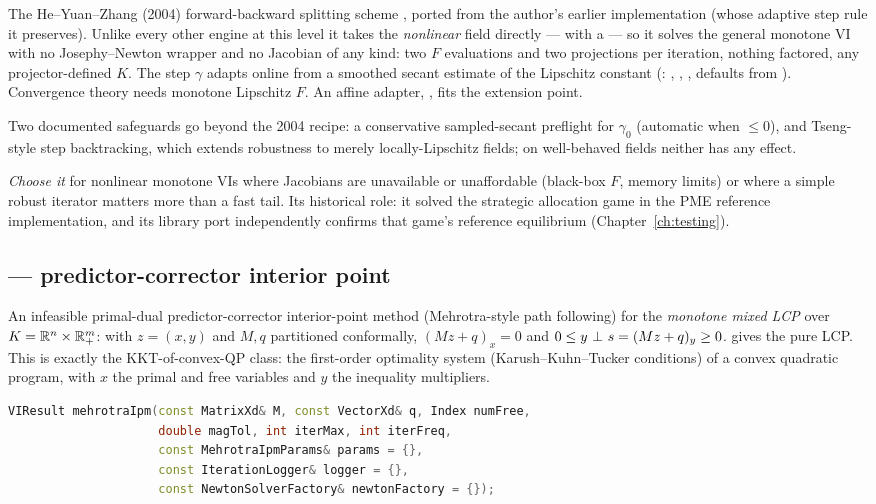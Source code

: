 The He--Yuan--Zhang (2004) forward-backward splitting scheme
\cite{hyz2004}, ported from the author's earlier 
implementation (whose adaptive step rule it preserves). Unlike every other
engine at this level it takes the \emph{nonlinear} field directly ---
 with
 a  --- so it solves the general monotone VI with
no Josephy--Newton wrapper and no Jacobian of any kind: two $F$ evaluations
and two projections per iteration, nothing factored, any projector-defined
$K$. The step $\gamma$ adapts online from a smoothed secant estimate of the
Lipschitz constant (: , ,
, defaults from ). Convergence theory needs
monotone Lipschitz $F$. An affine adapter, , fits
the  extension point.

Two documented safeguards go beyond the 2004 recipe: a conservative
sampled-secant preflight for $\gamma_0$ (automatic when 
$\le 0$), and Tseng-style step backtracking, which extends robustness to
merely locally-Lipschitz fields; on well-behaved fields neither has any
effect.

\emph{Choose it} for nonlinear monotone VIs where Jacobians are unavailable
or unaffordable (black-box $F$, memory limits) or where a simple robust
iterator matters more than a fast tail. Its historical role: it solved the
strategic allocation game in the PME reference implementation, and its
library port independently confirms that game's reference equilibrium
(Chapter~\ref{ch:testing}).

\subsection{ --- predictor-corrector interior point}
\label{sec:ipm}

An infeasible primal-dual predictor-corrector interior-point method
(Mehrotra-style path following) for the \emph{monotone mixed LCP} over
$K = \mathbb{R}^{n} \times \mathbb{R}^{m}_{+}$: with $z = (x, y)$ and $M, q$ partitioned conformally,
$(Mz+q)_x = 0$ and $0 \le y \ \bot\  s = (Mz+q)_y \ge 0$. 
gives the pure LCP. This is exactly the KKT-of-convex-QP class: the
first-order optimality system (Karush--Kuhn--Tucker conditions) of a convex
quadratic program, with $x$ the primal and free variables and $y$ the
inequality multipliers.

\begin{lstlisting}[language=C++]
VIResult mehrotraIpm(const MatrixXd& M, const VectorXd& q, Index numFree,
                     double magTol, int iterMax, int iterFreq,
                     const MehrotraIpmParams& params = {},
                     const IterationLogger& logger = {},
                     const NewtonSolverFactory& newtonFactory = {});
\end{lstlisting}

